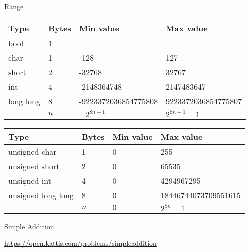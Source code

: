 \documentclass{beamer}
\begin{document}
\begin{frame}{Range}
    {\scriptsize
        \begin{center}
            \begin{tabular}{l|lll}
                Type & Bytes & Min value & Max value \\
                \hline
                bool & 1 & & \\
                char & 1 & -128 & 127 \\
                short & 2 & -32768 & 32767 \\
                int & 4 & -2148364748 & 2147483647 \\
                long long & 8 & -9223372036854775808 & 9223372036854775807 \\
                          & $n$ & $-2^{8n-1}$ & $2^{8n-1}-1$
            \end{tabular}
        \end{center}
    }

    {\scriptsize
        \begin{center}
            \begin{tabular}{l|lll}
                Type & Bytes & Min value & Max value \\
                \hline
                unsigned char & 1 & 0 & 255 \\
                unsigned short & 2 & 0 & 65535 \\
                unsigned int & 4 & 0 & 4294967295 \\
                unsigned long long & 8 & 0 & 18446744073709551615 \\
                    & $n$ & $0$ & $2^{8n}-1$
            \end{tabular}
        \end{center}
    }
\end{frame}

\begin{frame}{Simple Addition}
  \begin{center}
    \href{https://open.kattis.com/problems/simpleaddition}{https://open.kattis.com/problems/simpleaddition}
  \end{center}
\end{frame}
\end{document}
